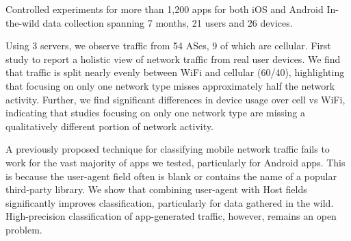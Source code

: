 
Controlled experiments for more than 1,200 apps for both iOS and Android
In-the-wild data collection spanning 7 months, 21 users and 26 devices.

Using 3 \platname{} servers, we observe traffic from 54 ASes, 9 of which are cellular. 
First study to report a holistic view of network traffic from real user devices. We find that 
traffic is split nearly evenly between WiFi and cellular (60/40), highlighting that focusing 
on only one network type misses approximately half the network activity. Further, we 
find significant differences in device usage over cell vs WiFi, indicating that studies focusing 
on only one network type are missing a qualitatively different portion of network activity. 

A previously proposed technique for classifying mobile network traffic fails to work for the 
vast majority of apps we tested, particularly for Android apps. This is because the user-agent 
field often is blank or contains the name of a popular third-party library. We show that combining 
user-agent with Host fields significantly improves classification, particularly for data gathered 
in the wild. High-precision classification of app-generated traffic, however, remains an open problem. 

